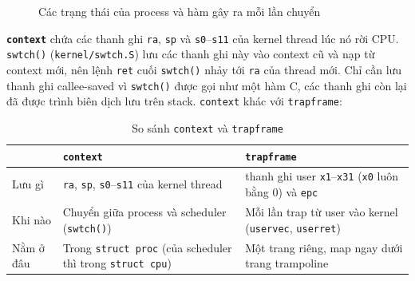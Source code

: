 \begin{figure}[H]
\centering
{}
\caption{Các trạng thái của process và hàm gây ra mỗi lần chuyển}
\label{fig:procstate}
\end{figure}

\textbf{\texttt{context}} chứa các thanh ghi \texttt{ra}, \texttt{sp} và \texttt{s0}--\texttt{s11} của kernel thread lúc nó rời CPU. \texttt{swtch()} (\texttt{kernel/swtch.S}) lưu các thanh ghi này vào context cũ và nạp từ context mới, nên lệnh \texttt{ret} cuối \texttt{swtch()} nhảy tới \texttt{ra} của thread mới. Chỉ cần lưu thanh ghi callee-saved vì \texttt{swtch()} được gọi như một hàm C, các thanh ghi còn lại đã được trình biên dịch lưu trên stack. \texttt{context} khác với \texttt{trapframe}:

\begin{table}[H]
\centering
\begin{tabularx}{\textwidth}{|l|>{\raggedright\arraybackslash}X|>{\raggedright\arraybackslash}X|}
\hline
 & \textbf{\texttt{context}} & \textbf{\texttt{trapframe}} \\ \hline
Lưu gì & \texttt{ra}, \texttt{sp}, \texttt{s0}--\texttt{s11} của kernel thread & 31 thanh ghi user \texttt{x1}--\texttt{x31} (\texttt{x0} luôn bằng 0) và \texttt{epc} \\ \hline
Khi nào & Chuyển giữa process và scheduler (\texttt{swtch()}) & Mỗi lần trap từ user vào kernel (\texttt{uservec}, \texttt{userret}) \\ \hline
Nằm ở đâu & Trong \texttt{struct proc} (của scheduler thì trong \texttt{struct cpu}) & Một trang riêng, map ngay dưới trang trampoline \\ \hline
\end{tabularx}
\caption{So sánh \texttt{context} và \texttt{trapframe}}
\end{table}
